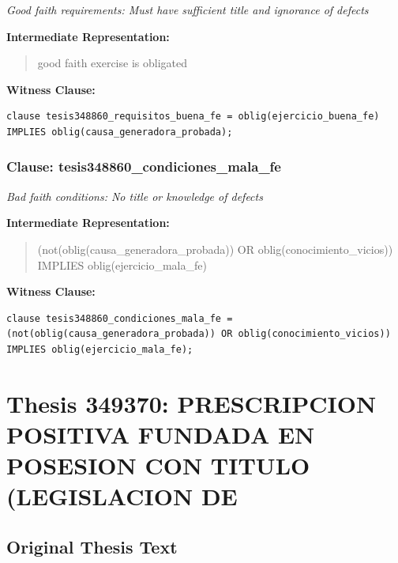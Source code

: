 \documentclass[11pt,a4paper]{article}
\begin{document}
\textit{Good faith requirements: Must have sufficient title and ignorance of defects}

\textbf{Intermediate Representation:}

\begin{quote}
good faith exercise is obligated
\end{quote}

\textbf{Witness Clause:}

\begin{lstlisting}[style=witnessstyle, language=Witness]
clause tesis348860_requisitos_buena_fe = oblig(ejercicio_buena_fe) IMPLIES oblig(causa_generadora_probada);
\end{lstlisting}

\subsubsection{Clause: tesis348860\_condiciones\_mala\_fe}

\textit{Bad faith conditions: No title or knowledge of defects}

\textbf{Intermediate Representation:}

\begin{quote}
(not(oblig(causa\_generadora\_probada)) OR oblig(conocimiento\_vicios)) IMPLIES oblig(ejercicio\_mala\_fe)
\end{quote}

\textbf{Witness Clause:}

\begin{lstlisting}[style=witnessstyle, language=Witness]
clause tesis348860_condiciones_mala_fe = (not(oblig(causa_generadora_probada)) OR oblig(conocimiento_vicios)) IMPLIES oblig(ejercicio_mala_fe);
\end{lstlisting}

\newpage

\section{Thesis 349370: PRESCRIPCION POSITIVA FUNDADA EN POSESION CON TITULO (LEGISLACION DE}
\label{thesis:349370}

\subsection{Original Thesis Text}
\end{document}
